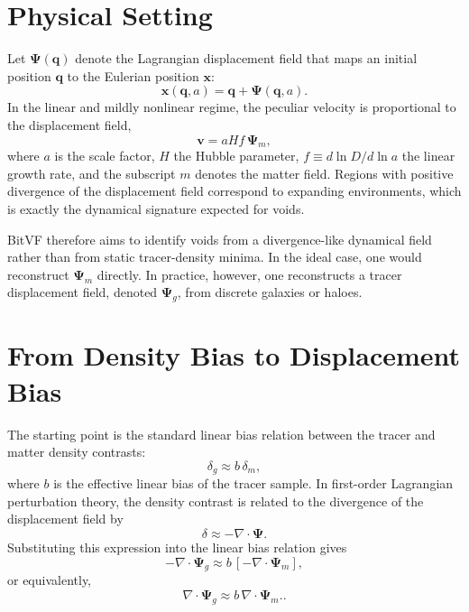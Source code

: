 \documentclass[12pt]{report}
\begin{document}
\section{Physical Setting}

Let $\boldsymbol{\Psi}(\mathbf{q})$ denote the Lagrangian displacement field that maps an initial position $\mathbf{q}$ to the Eulerian position $\mathbf{x}$:
\begin{equation}
    \mathbf{x}(\mathbf{q},a) = \mathbf{q} + \boldsymbol{\Psi}(\mathbf{q},a).
\end{equation}
In the linear and mildly nonlinear regime, the peculiar velocity is proportional to the displacement field,
\begin{equation}
    \mathbf{v} = aHf\,\boldsymbol{\Psi}_m,
\end{equation}
where $a$ is the scale factor, $H$ the Hubble parameter, $f \equiv d\ln D/d\ln a$ the linear growth rate, and the subscript $m$ denotes the matter field. Regions with positive divergence of the displacement field correspond to expanding environments, which is exactly the dynamical signature expected for voids.

BitVF therefore aims to identify voids from a divergence-like dynamical field rather than from static tracer-density minima. In the ideal case, one would reconstruct $\boldsymbol{\Psi}_m$ directly. In practice, however, one reconstructs a tracer displacement field, denoted $\boldsymbol{\Psi}_g$, from discrete galaxies or haloes.

\section{From Density Bias to Displacement Bias}

The starting point is the standard linear bias relation between the tracer and matter density contrasts:
\begin{equation}
    \delta_g \approx b\,\delta_m,
\end{equation}
where $b$ is the effective linear bias of the tracer sample. In first-order Lagrangian perturbation theory, the density contrast is related to the divergence of the displacement field by
\begin{equation}
    \delta \approx -\nabla \cdot \boldsymbol{\Psi}.
\end{equation}
Substituting this expression into the linear bias relation gives
\begin{equation}
    -\nabla \cdot \boldsymbol{\Psi}_g \approx b\,[-\nabla \cdot \boldsymbol{\Psi}_m],
\end{equation}
or equivalently,
\begin{equation}
    \nabla \cdot \boldsymbol{\Psi}_g \approx b\,\nabla \cdot \boldsymbol{\Psi}_m.
    \label{eq:div_bias_relation}.
\end{equation}
\end{document}
